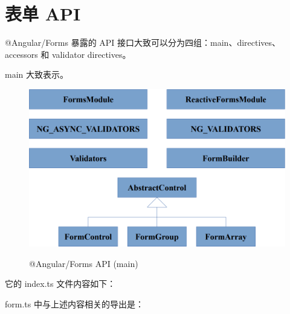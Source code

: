 \section{表单 API}


@Angular/Forms 暴露的 API 接口大致可以分为四组：main、directives、accessors 和 validator directives。


main 大致表示。

\begin{figure}[!hbt]
  \centering
  \caption{@Angular/Forms API (main)}
  \includegraphics[width=0.75\linewidth]{15_the_forms_package/forms_api_main}
  \label{fig:forms_api_main}
\end{figure}


它的 index.ts 文件内容如下：




form.ts 中与上述内容相关的导出是：




